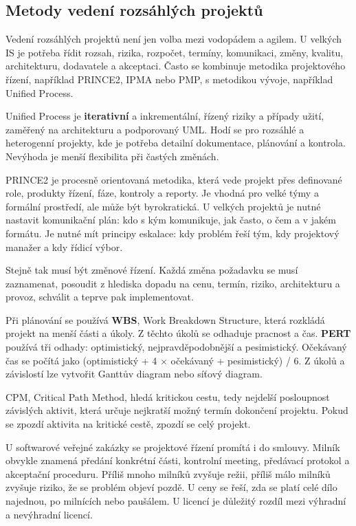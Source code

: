 \documentclass[11pt,a4paper]{article}
\begin{document}
\subsection*{Metody vedení rozsáhlých projektů}

Vedení rozsáhlých projektů není jen volba mezi vodopádem a agilem. U velkých IS je potřeba řídit rozsah, rizika, rozpočet, termíny, komunikaci, změny, kvalitu, architekturu, dodavatele a akceptaci. Často se kombinuje metodika projektového řízení, například PRINCE2, IPMA nebo PMP, s metodikou vývoje, například Unified Process.

Unified Process je \textbf{iterativní} a inkrementální, řízený riziky a případy užití, zaměřený na architekturu a podporovaný UML. Hodí se pro rozsáhlé a heterogenní projekty, kde je potřeba detailní dokumentace, plánování a kontrola. Nevýhoda je menší flexibilita při častých změnách.

PRINCE2 je procesně orientovaná metodika, která vede projekt přes definované role, produkty řízení, fáze, kontroly a reporty. Je vhodná pro velké týmy a formální prostředí, ale může být byrokratická. U velkých projektů je nutné nastavit komunikační plán: kdo s kým komunikuje, jak často, o čem a v jakém formátu. Je nutné mít principy eskalace: kdy problém řeší tým, kdy projektový manažer a kdy řídicí výbor.

Stejně tak musí být změnové řízení. Každá změna požadavku se musí zaznamenat, posoudit z hlediska dopadu na cenu, termín, riziko, architekturu a provoz, schválit a teprve pak implementovat.

Při plánování se používá \textbf{WBS}, Work Breakdown Structure, která rozkládá projekt na menší části a úkoly. Z těchto úkolů se odhaduje pracnost a čas. \textbf{PERT} používá tři odhady: optimistický, nejpravděpodobnější a pesimistický. Očekávaný čas se počítá jako (optimistický + 4 $\times$ očekávaný + pesimistický) / 6. Z úkolů a závislostí lze vytvořit Ganttův diagram nebo síťový diagram.

CPM, Critical Path Method, hledá kritickou cestu, tedy nejdelší posloupnost závislých aktivit, která určuje nejkratší možný termín dokončení projektu. Pokud se zpozdí aktivita na kritické cestě, zpozdí se celý projekt.

U softwarové veřejné zakázky se projektové řízení promítá i do smlouvy. Milník obvykle znamená předání konkrétní části, kontrolní meeting, předávací protokol a akceptační proceduru. Příliš mnoho milníků zvyšuje režii, příliš málo milníků zvyšuje riziko, že se problém objeví pozdě. U ceny se řeší, zda se platí celé dílo najednou, po milnících nebo paušálem. U licencí je důležitý rozdíl mezi výhradní a nevýhradní licencí.
\end{document}
